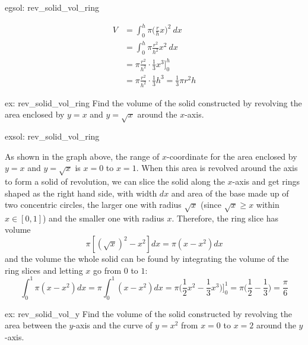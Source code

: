 \begin{egsol}[]{egsol: rev_solid_vol_ring}
\begin{enumerate}[a)]
\begin{center}
        \end{center}
        \begin{align*}
            V &= \int_0^h \pi \big(\frac{r}{h}x)^2~dx\\
            &= \int_0^h \pi \frac{r^2}{h^2} x^2~dx\\
            &= \pi \frac{r^2}{h^2} \cdot \frac{1}{3}x^3 \Big]_0^h\\
            &= \pi \frac{r^2}{h^2} \cdot \frac{1}{3}h^3 = \frac{1}{3} \pi r^2 h
        \end{align*}
    \end{enumerate}
\end{egsol}

\begin{ex}[]{ex: rev_solid_vol_ring}
    Find the volume of the solid constructed by revolving the area enclosed by $y = x$ and $y = \sqrt{x}$ around the $x$-axis.
\end{ex}

\begin{exsol}[]{exsol: rev_solid_vol_ring}
    \begin{center}
    \end{center}
    As shown in the graph above, the range of $x$-coordinate for the area enclosed by $y=x$ and $y=\sqrt{x}$ is $x=0$ to $x=1$.  When this area is revolved around the axis to form a solid of revolution, we can slice the solid along the $x$-axis and get rings shaped as the right hand side, with width $dx$ and area of the base made up of two concentric circles, the larger one with radius $\sqrt{x}$ (since $\sqrt{x} \ge x$ within $x \in [0, 1]$) and the smaller one with radius $x$.  Therefore, the ring slice has volume
    \[\pi [(\sqrt{x})^2 - x^2] dx = \pi (x - x^2) dx\]
    and the volume the whole solid can be found by integrating the volume of the ring slices and letting $x$ go from $0$ to $1$:
    \[\int_0^1 \pi (x - x^2) dx = \pi \int_0^1 (x - x^2) dx = \pi \Big(\frac{1}{2}x^2 - \frac{1}{3}x^3\Big)\Big]_0^1 = \pi \Big(\frac{1}{2}-\frac{1}{3}) = \frac{\pi}{6}\]
\end{exsol}

\begin{ex}[]{ex: rev_solid_vol_y}
    Find the volume of the solid constructed by revolving the area between the $y$-axis and the curve of $y = x^2$ from $x = 0$ to $x = 2$ around the $y$-axis. 
\end{ex}


